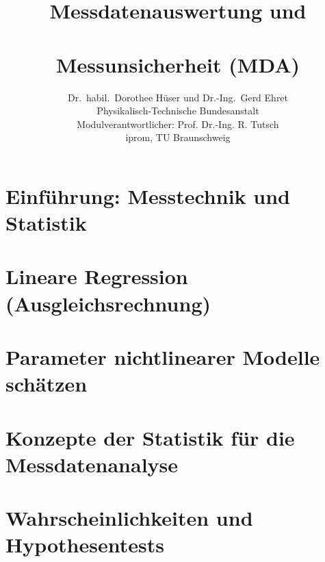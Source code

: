 \documentclass[a4paper,11pt]{book}
\title{\normalfont\sffamily\bfseries{\Huge{Messdatenauswertung und\\~\\ Messunsicherheit (MDA)}}}
\author{Dr.\ habil.\ Dorothee Hüser und Dr.-Ing.\ Gerd Ehret\\
Physikalisch-Technische Bundesanstalt\\
Modulverantwortlicher: Prof. Dr.-Ing. R. Tutsch\\
iprom, TU Braunschweig}
\begin{document}
\frontmatter                            %
\maketitle                              %
\tableofcontents                        %
\mainmatter                             %

\chapter{Einführung: Messtechnik und Statistik}

%
\chapter{Lineare Regression (Ausgleichsrechnung)}
\label{KapitellinReg}

%
\chapter{Parameter nichtlinearer Modelle schätzen}
\label{nonlinOpti}


\chapter{Konzepte der Statistik für die Messdatenanalyse}
\label{konzepteStatistik}

%
\chapter{Wahrscheinlichkeiten und Hypothesentests}
\label{wahrscheinlichHyp}

\end{document}
